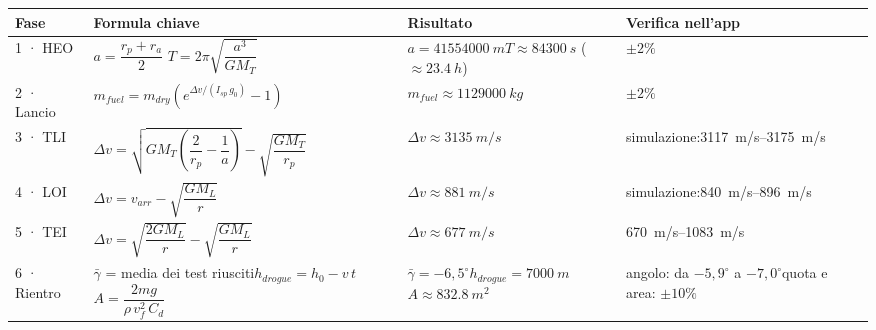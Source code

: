 \documentclass[11pt,a4paper]{article}
\newcommand{\dv}{\Delta v}
\begin{document}
{\small\renewcommand{\arraystretch}{1.9}
\begin{tabularx}{\linewidth}{@{}>{\raggedright}p{1.7cm} >{\raggedright\arraybackslash}X >{\raggedright}p{3.4cm} >{\raggedright\arraybackslash}p{2.7cm}@{}}
\toprule
\textbf{Fase} & \textbf{Formula chiave} & \textbf{Risultato} & \textbf{Verifica nell'app}\\\midrule
1 · HEO & $a = \dfrac{r_p + r_a}{2}$ \qquad $T = 2\pi\sqrt{\dfrac{a^3}{GM_T}}$ & $a = \SI{41554000}{m}$\newline $T \approx \SI{84300}{s}$ ($\approx\SI{23.4}{h}$) & $\pm 2\%$\\
2 · Lancio & $m_{fuel} = m_{dry}\left(e^{\dv/(I_{sp}\,g_0)} - 1\right)$ & $m_{fuel} \approx \SI{1129000}{kg}$ & $\pm 2\%$\\
3 · TLI & $\dv = \sqrt{GM_T\left(\dfrac{2}{r_p} - \dfrac1a\right)} - \sqrt{\dfrac{GM_T}{r_p}}$ & $\dv \approx \SI{3135}{m/s}$ & simulazione:\newline \SIrange{3117}{3175}{m/s}\\
4 · LOI & $\dv = v_{arr} - \sqrt{\dfrac{GM_L}{r}}$ & $\dv \approx \SI{881}{m/s}$ & simulazione:\newline \SIrange{840}{896}{m/s}\\
5 · TEI & $\dv = \sqrt{\dfrac{2GM_L}{r}} - \sqrt{\dfrac{GM_L}{r}}$ & $\dv \approx \SI{677}{m/s}$ & \SIrange{670}{1083}{m/s}\\
6 · Rientro & $\bar\gamma$ = media dei test riusciti\newline $h_{drogue} = h_0 - v\,t$ \qquad $A = \dfrac{2mg}{\rho\, v_f^2\, C_d}$ & $\bar\gamma = -6{,}5^\circ$\newline $h_{drogue} = \SI{7000}{m}$\newline $A \approx \SI{832.8}{m^2}$ & angolo: da $-5{,}9^\circ$ a $-7{,}0^\circ$\newline quota e area: $\pm 10\%$\\
\bottomrule
\end{tabularx}}
\end{document}
